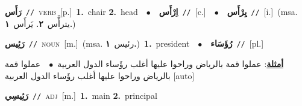 \documentclass[10pt,a4paper,twoside]{article} %
\begin{document}
\begin{multicols}{2}
{\setlength\topsep{0pt}\textbf{\foreignlanguage{arabic}{رَأَس}}\ {\color{gray}\texttt{//}\color{black}}\ \textsc{verb}\ [p.]\ \textbf{1.}~chair  \textbf{2.}~head\ \ $\bullet$\ \ \setlength\topsep{0pt}\textbf{\foreignlanguage{arabic}{اِرْأَس}}\ {\color{gray}\texttt{//}\color{black}}\ [c.]\ \ $\bullet$\ \ \setlength\topsep{0pt}\textbf{\foreignlanguage{arabic}{يِرْأَس}}\ {\color{gray}\texttt{//}\color{black}}\ [i.]\ \color{gray}(msa. \foreignlanguage{arabic}{يترأَّس}~\foreignlanguage{arabic}{\textbf{٢.}}  \foreignlanguage{arabic}{يَرأَس}~\foreignlanguage{arabic}{\textbf{١.}})\color{black}\ } \vspace{2mm}

{\setlength\topsep{0pt}\textbf{\foreignlanguage{arabic}{رَئِيس}}\ {\color{gray}\texttt{//}\color{black}}\ \textsc{noun}\ [m.]\ \color{gray}(msa. \foreignlanguage{arabic}{رئيس}~\foreignlanguage{arabic}{\textbf{١.}})\color{black}\ \textbf{1.}~president\ \ $\bullet$\ \ \setlength\topsep{0pt}\textbf{\foreignlanguage{arabic}{رُؤَسَاء}}\ {\color{gray}\texttt{//}\color{black}}\ [pl.]\  \begin{flushright}\color{gray}\foreignlanguage{arabic}{\textbf{\underline{\foreignlanguage{arabic}{أمثلة}}}: عملوا قمة بالرياض وراحوا عليها أغلب رؤَساء الدول العربية\ $\bullet$\ \  عملوا قمة بالرياض وراحوا عليها أغلب رؤَساء الدول العربية [auto]}\end{flushright}\color{black}} \vspace{2mm}

{\setlength\topsep{0pt}\textbf{\foreignlanguage{arabic}{رَئِيسِي}}\ {\color{gray}\texttt{//}\color{black}}\ \textsc{adj}\ [m.]\ \textbf{1.}~main  \textbf{2.}~principal\ } \vspace{2mm}


\end{multicols}
\end{document}
